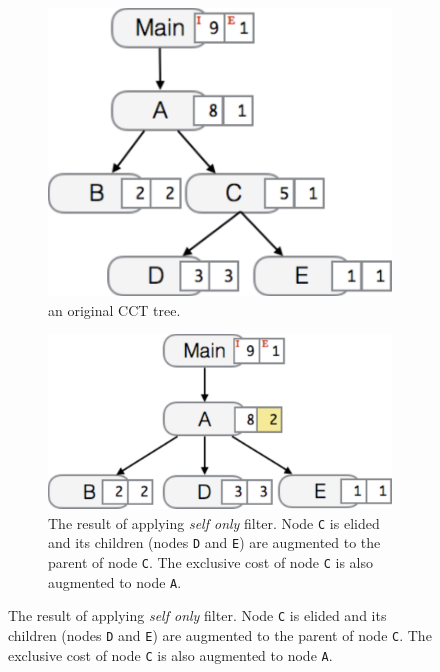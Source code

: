 \begin{figure}
  \centering
  \begin{subfigure}{.45\textwidth}
    \centering
    \includegraphics[scale=.4]{fig/hpcviewer-filter-cct.pdf}
    \caption{an original CCT tree.}
    \label{fig:filter-cct}
  \end{subfigure}%
  \qquad
  \begin{subfigure}{.45\textwidth}
    \centering
    \includegraphics[scale=.4]{fig/hpcviewer-filter-self.pdf}
    \caption{The result of applying \emph{self only} filter. %
Node \texttt{C} is elided and its children (nodes \texttt{D} and \texttt{E}) are augmented to the parent of node \texttt{C}. 
The exclusive cost of node \texttt{C} is also augmented to node \texttt{A}.}
    \label{fig:filter-self}
  \end{subfigure}

\end{figure}
